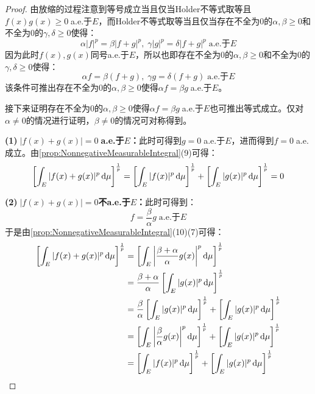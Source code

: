 \begin{proof}
	由放缩的过程注意到等号成立当且仅当Holder不等式取等且$f(x)g(x)\geqslant0\;$a.e.于$E$，而Holder不等式取等当且仅当存在不全为$0$的$\alpha,\beta\geqslant0$和不全为$0$的$\gamma,\delta\geqslant0$使得：
	\begin{equation*}
		\alpha|f|^p=\beta|f+g|^p,\;\gamma|g|^p=\delta|f+g|^p\;\text{a.e.于$E$}
	\end{equation*}
	因为此时$f(x),g(x)$同号a.e.于$E$，所以也即存在不全为$0$的$\alpha,\beta\geqslant0$和不全为$0$的$\gamma,\delta\geqslant0$使得：
	\begin{equation*}
		\alpha f=\beta (f+g),\;\gamma g=\delta(f+g)\;\text{a.e.于$E$}
	\end{equation*}
	该条件可推出存在不全为$0$的$\alpha,\beta\geqslant0$使得$\alpha f=\beta g\;$a.e.于$E$。\par
	接下来证明存在不全为$0$的$\alpha,\beta\geqslant0$使得$\alpha f=\beta g\;$a.e.于$E$也可推出等式成立。仅对$\alpha\ne0$的情况进行证明，$\beta\ne0$的情况可对称得到。\par
	\textbf{(1)$\;|f(x)+g(x)|=0\;$a.e.于$E$：}此时可得到$g=0\;$a.e.于$E$，进而得到$f=0\;$a.e.成立。由\cref{prop:NonnegativeMeasurableIntegral}(9)可得：
	\begin{equation*}
		\left[\int_{E}^{}|f(x)+g(x)|^p\mathop{}\!\mathrm{d}\mu\right]^\frac{1}{p}=\left[\int_{E}^{}|f(x)|^p\mathop{}\!\mathrm{d}\mu\right]^\frac{1}{p}+\left[\int_{E}^{}|g(x)|^p\mathop{}\!\mathrm{d}\mu\right]^\frac{1}{p}=0
	\end{equation*}\par
	\textbf{(2)$\;|f(x)+g(x)|=0$不a.e.于$E$：}此时可得到：
	\begin{equation*}
		f=\frac{\beta}{\alpha}g\;\text{a.e.于$E$}
	\end{equation*}
	于是由\cref{prop:NonnegativeMeasurableIntegral}(10)(7)可得：
	\begin{align*}
		\left[\int_{E}^{}|f(x)+g(x)|^p\dif\mu\right]^{\frac{1}{p}}&=\left[\int_{E}^{}\left|\frac{\beta+\alpha}{\alpha}g(x)\right|^p\dif\mu\right]^\frac{1}{p} \\
		&=\frac{\beta+\alpha}{\alpha}\left[\int_{E}^{}|g(x)|^p\dif\mu\right]^\frac{1}{p} \\
		&=\frac{\beta}{\alpha}\left[\int_{E}^{}|g(x)|^p\dif\mu\right]^\frac{1}{p}+\left[\int_{E}^{}|g(x)|^p\dif\mu\right]^\frac{1}{p} \\
		&=\left[\int_{E}\left|\frac{\beta}{\alpha}g(x)\right|^p\dif\mu\right]^{\frac{1}{p}}+\left[\int_{E}^{}|g(x)|^p\dif\mu\right]^\frac{1}{p} \\
		&=\left[\int_{E}^{}|f(x)|^p\dif\mu\right]^\frac{1}{p}+\left[\int_{E}^{}|g(x)|^p\dif\mu\right]^\frac{1}{p}\qedhere
	\end{align*}
\end{proof}
